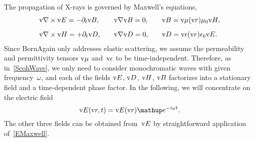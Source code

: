 The propagation of X-rays is governed by Maxwell's equations,
%
%
\begin{equation}\label{EMaxwell}
  \begin{array}{lll}
    \text{v}{\nabla}\times\text{v}{E}=-\partial_t \text{v}{B},\quad
   &\text{v}{\nabla}\text{v}{B}=0,\quad
   &\text{v}{B}=\text{v}{\mu}(\text{v}{r})\mu_0\text{v}{H},
   \\[2ex]
    \text{v}{\nabla}\times\text{v}{H}=+\partial_t \text{v}{D},\quad
   &\text{v}{\nabla}\text{v}{D}=0,\quad
   &\text{v}{D}=\text{v}{\epsilon}(\text{v}{r})\epsilon_0\text{v}{E}.
  \end{array}
\end{equation}
%
%
%
%
%
%
%
%
Since BornAgain only addresses elastic scattering,
%
%
we assume the permeability and permittivity tensors $\text{v}\mu$ and~$\text{v}\epsilon$
to be time-independent.
%
Therefore, as in~\cref{ScohWave}, we only need to consider monochromatic waves
%
%
with given frequency~$\omega$,
and each of the fields $\text{v}{E}$, $\text{v}{D}$, $\text{v}{H}$, $\text{v}{B}$
factorizes into a stationary field and a time-dependent phase factor.
%
In the following, we will concentrate on the electric field
%
\begin{equation}
  \v{E}(\r,t) = \v{E}(\r)\e^{-i\omega t}.
\end{equation}
The other three fields can be obtained from~$\text{v}{E}$
by straightforward application of~\cref{EMaxwell}.


